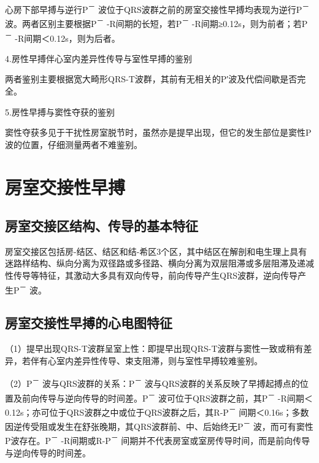 心房下部早搏与逆行P\textsuperscript{－}
波位于QRS波群之前的房室交接性早搏均表现为逆行P\textsuperscript{－}
波。两者区别主要根据P\textsuperscript{－}
-R间期的长短，若P\textsuperscript{－}
-R间期≥0.12s，则为前者；若P\textsuperscript{－}
-R间期＜0.12s，则为后者。

4.房性早搏伴心室内差异性传导与室性早搏的鉴别

两者鉴别主要根据宽大畸形QRS-T波群，其前有无相关的P′波及代偿间歇是否完全。

5.房性早搏与窦性夺获的鉴别

窦性夺获多见于干扰性房室脱节时，虽然亦是提早出现，但它的发生部位是窦性P波的位置，仔细测量两者不难鉴别。

\protect\hypertarget{text00018.htmlux5cux23subid143}{}{}

\section{房室交接性早搏}

\protect\hypertarget{text00018.htmlux5cux23subid144}{}{}

\subsection{房室交接区结构、传导的基本特征}

房室交接区包括房-结区、结区和结-希区3个区，其中结区在解剖和电生理上具有迷路样结构、纵向分离为双径路或多径路、横向分离为双层阻滞或多层阻滞及递减性传导等特征，其激动大多具有双向传导，前向传导产生QRS波群，逆向传导产生P\textsuperscript{－}
波。

\protect\hypertarget{text00018.htmlux5cux23subid145}{}{}

\subsection{房室交接性早搏的心电图特征}

（1）提早出现QRS-T波群呈室上性：即提早出现QRS-T波群与窦性一致或稍有差异，若伴有心室内差异性传导、束支阻滞，则与室性早搏较难鉴别。

（2）P\textsuperscript{－} 波与QRS波群的关系：P\textsuperscript{－}
波与QRS波群的关系反映了早搏起搏点的位置及前向传导与逆向传导的时间差。P\textsuperscript{－}
波可位于QRS波群之前，其P\textsuperscript{－}
-R间期＜0.12s；亦可位于QRS波群之中或位于QRS波群之后，其R-P\textsuperscript{－}
间期＜0.16s；多数因逆传受阻或发生在舒张晚期，其QRS波群前、中、后始终无P\textsuperscript{－}
波，而可有窦性P波存在。P\textsuperscript{－}
-R间期或R-P\textsuperscript{－}
间期并不代表房室或室房传导时间，而是前向传导与逆向传导的时间差。

